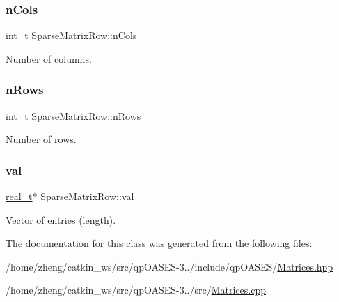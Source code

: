 \subsubsection{\texorpdfstring{n\+Cols}{nCols}}
{\footnotesize\ttfamily \hyperlink{_types_8hpp_ab6fd6105e64ed14a0c9281326f05e623}{int\+\_\+t} Sparse\+Matrix\+Row\+::n\+Cols\hspace{0.3cm}{\ttfamily [protected]}}

Number of columns. \mbox{\label{class_sparse_matrix_row_af443a2e2deccc57576c1cb3ad64a8755}} 
\subsubsection{\texorpdfstring{n\+Rows}{nRows}}
{\footnotesize\ttfamily \hyperlink{_types_8hpp_ab6fd6105e64ed14a0c9281326f05e623}{int\+\_\+t} Sparse\+Matrix\+Row\+::n\+Rows\hspace{0.3cm}{\ttfamily [protected]}}

Number of rows. \mbox{\label{class_sparse_matrix_row_a2cec7a8738e87414eaf6ebdf1056b3ab}} 
\subsubsection{\texorpdfstring{val}{val}}
{\footnotesize\ttfamily \hyperlink{qp_o_a_s_e_s__wrapper_8h_a0d00e2b3dfadee81331bbb39068570c4}{real\+\_\+t}$\ast$ Sparse\+Matrix\+Row\+::val\hspace{0.3cm}{\ttfamily [protected]}}

Vector of entries (length). 

The documentation for this class was generated from the following files\+:\begin{DoxyCompactItemize}
\item 
/home/zheng/catkin\+\_\+ws/src/qp\+O\+A\+S\+E\+S-\/3../include/qp\+O\+A\+S\+E\+S/\hyperlink{_matrices_8hpp}{Matrices.\+hpp}\item 
/home/zheng/catkin\+\_\+ws/src/qp\+O\+A\+S\+E\+S-\/3../src/\hyperlink{_matrices_8cpp}{Matrices.\+cpp}\end{DoxyCompactItemize}
